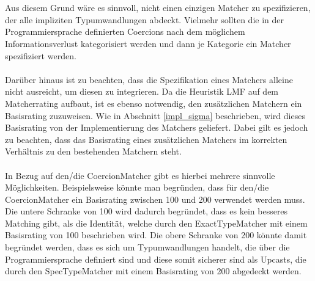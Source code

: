 \\\\
Aus diesem Grund wäre es sinnvoll, nicht einen einzigen Matcher zu spezifizieren, der alle impliziten Typumwandlungen abdeckt. Vielmehr sollten die in der Programmiersprache definierten Coercions nach dem möglichem Informationsverlust kategorisiert werden und dann je Kategorie ein Matcher spezifiziert werden.
\\\\
Darüber hinaus ist zu beachten, dass die Spezifikation eines Matchers alleine nicht ausreicht, um diesen zu integrieren. Da die Heuristik LMF auf dem Matcherrating aufbaut, ist es ebenso notwendig, den zusätzlichen Matchern ein Basisrating zuzuweisen. Wie in Abschnitt \ref{impl_sigma} beschrieben, wird dieses Basisrating von der Implementierung des Matchers geliefert. Dabei gilt es jedoch zu beachten, dass das Basisrating eines zusätzlichen Matchers im korrekten Verhältnis zu den bestehenden Matchern steht.
\\\\
In Bezug auf den/die CoercionMatcher gibt es hierbei mehrere sinnvolle Möglichkeiten. Beispielsweise könnte man begründen, dass für den/die CoercionMatcher ein Basisrating zwischen 100 und 200 verwendet werden muss. Die untere Schranke von 100 wird dadurch begründet, dass es kein besseres Matching gibt, als die Identität, welche durch den ExactTypeMatcher mit einem Basisrating von 100 beschrieben wird. Die obere Schranke von 200 könnte damit begründet werden, dass es sich um Typumwandlungen handelt, die über die Programmiersprache definiert sind und diese somit sicherer sind als Upcasts, die durch den SpecTypeMatcher mit einem Basisrating von 200 abgedeckt werden.
